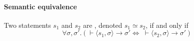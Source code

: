 \paragraph{Semantic equivalence}
\inlinedefinition Two statements $s_1$ and $s_2$ are , denoted $s_1 \simeq s_2$, if and only if
\[
    \forall \sigma, \sigma' . (\vdash \langle s_1, \sigma \rangle \rightarrow \sigma' \Longleftrightarrow \; \vdash \langle s_2, \sigma \rangle \rightarrow \sigma')
\]
